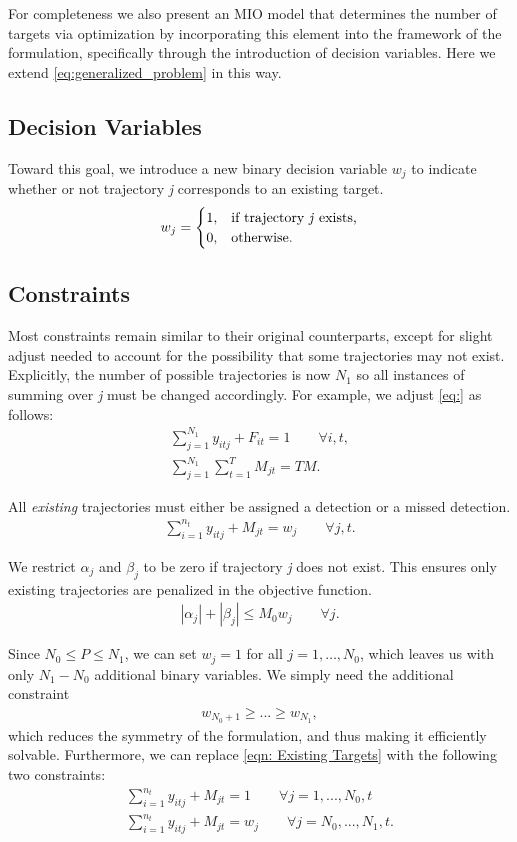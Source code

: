 For completeness we also present an MIO model that determines the number of targets via optimization by incorporating this element into the framework of the formulation, specifically through the introduction of decision variables. Here we extend \eqref{eq:generalized_problem} in this way. 

\subsection{Decision Variables}
Toward this goal, we introduce a new binary decision variable $w_{j}$ to indicate whether or not trajectory \textit{j} corresponds to an existing target.
\[w_{j} = 
\begin{cases}
1, & \text{if trajectory \textit{j} exists,}\\
0, & \text{otherwise.}
\end{cases}\]

\subsection{Constraints}
Most constraints remain similar to their original counterparts, except for slight adjust needed to account for the possibility that some trajectories may not exist. Explicitly, the number of possible trajectories is now $N_{1}$ so all instances of summing over \textit{j} must be changed accordingly. For example, we adjust \eqref{eq:} as follows: 
\begin{align*}
\sum_{j=1}^{N_{1}} y_{itj} + F_{it} = 1 \qquad \forall i,t,\\
\sum_{j=1}^{N_{1}} \sum_{t=1}^{T} M_{jt} = TM.
\end{align*}

All \textit{existing} trajectories must either be assigned a detection or a missed detection. 
\begin{align}\label{eqn: Existing Targets}
\sum_{i=1}^{n_{t}} y_{itj} + M_{jt} = w_{j} \qquad \forall j,t.
\end{align}

We restrict $\alpha_{j}$ and $\beta_{j}$ to be zero if trajectory \textit{j} does not exist. This ensures only existing trajectories are penalized in the objective function. 
\begin{align*}
|\alpha_{j}|+|\beta_{j}| \leq M_{0}w_{j}\qquad \forall j.
\end{align*}

Since $N_{0} \leq P \leq N_{1}$, we can set $w_j=1$ for all $j=1,\ldots,N_0$, which leaves us with only $N_1-N_0$ additional binary variables. We simply need the additional constraint
\begin{align*}
w_{N_0+1}\geq ...\geq w_{N_1},
\end{align*}
which reduces the symmetry of the formulation, and thus making it efficiently solvable. Furthermore, we can replace \eqref{eqn: Existing Targets} with the following two constraints:
\begin{align*}
	\sum_{i=1}^{n_{t}} y_{itj} + M_{jt} = 1 \qquad \forall j=1,...,N_{0},t\\
	\sum_{i=1}^{n_{t}} y_{itj} + M_{jt} = w_{j} \qquad \forall j=N_{0},...,N_{1},t.
\end{align*}

